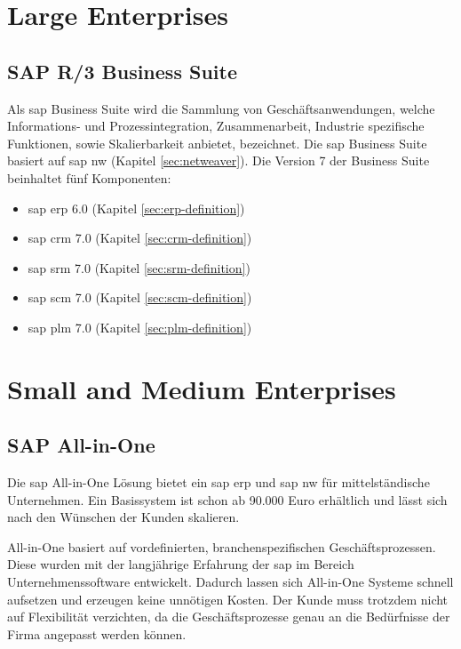 \section{Large Enterprises}
\subsection{SAP R/3 Business Suite}
\label{sec:business-suite}
Als \gls{sap} Business Suite wird die Sammlung von Geschäftsanwendungen, welche Informations- und Prozessintegration, Zusammenarbeit, Industrie spezifische Funktionen, sowie Skalierbarkeit anbietet, bezeichnet. Die \gls{sap} Business Suite basiert auf \gls{sap} \gls{nw} (Kapitel \ref{sec:netweaver}).
Die Version 7 der Business Suite beinhaltet fünf Komponenten:

\begin{itemize}
	\item \gls{sap} \gls{erp} 6.0 (Kapitel \ref{sec:erp-definition})
	\item \gls{sap} \gls{crm} 7.0 (Kapitel \ref{sec:crm-definition})
	\item \gls{sap} \gls{srm} 7.0 (Kapitel \ref{sec:srm-definition})
	\item \gls{sap} \gls{scm} 7.0 (Kapitel \ref{sec:scm-definition})
	\item \gls{sap} \gls{plm} 7.0 (Kapitel \ref{sec:plm-definition})
\end{itemize}

\cite{SAPNews}

\section{Small and Medium Enterprises}
\subsection{SAP All-in-One}
\label{sec:allinone}

Die \gls{sap} All-in-One Lösung bietet ein \gls{sap} \gls{erp} und \gls{sap} \gls{nw} für mittelständische Unternehmen. Ein Basissystem ist schon ab 90.000 Euro erhältlich und lässt sich nach den Wünschen der Kunden skalieren.

All-in-One basiert auf vordefinierten, branchenspezifischen Geschäftsprozessen. Diese wurden mit der langjährige Erfahrung der \gls{sap} im Bereich Unternehmenssoftware entwickelt. Dadurch lassen sich All-in-One Systeme schnell aufsetzen und erzeugen keine unnötigen Kosten. Der Kunde muss trotzdem nicht auf Flexibilität verzichten, da die Geschäftsprozesse genau an die Bedürfnisse der Firma angepasst werden können.

